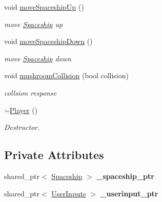 \begin{DoxyCompactItemize}
\mbox{\label{class_player_afd45fb5e09d49881ab0f01c4bad9579a}} 
void \mbox{\hyperlink{class_player_afd45fb5e09d49881ab0f01c4bad9579a}{move\+Spaceship\+Up}} ()
\begin{DoxyCompactList}\small\item\em move \mbox{\hyperlink{class_spaceship}{Spaceship}} up \end{DoxyCompactList}\item 
\mbox{\label{class_player_a03016a49c89eba88af462908b9ce205f}} 
void \mbox{\hyperlink{class_player_a03016a49c89eba88af462908b9ce205f}{move\+Spaceship\+Down}} ()
\begin{DoxyCompactList}\small\item\em move \mbox{\hyperlink{class_spaceship}{Spaceship}} down \end{DoxyCompactList}\item 
void \mbox{\hyperlink{class_player_acaa4c1b39f725f0de4b2b3d39bc34dd3}{mushroom\+Collision}} (bool collision)
\begin{DoxyCompactList}\small\item\em collsion response \end{DoxyCompactList}\item 
\mbox{\label{class_player_a749d2c00e1fe0f5c2746f7505a58c062}} 
\mbox{\hyperlink{class_player_a749d2c00e1fe0f5c2746f7505a58c062}{$\sim$\+Player}} ()
\begin{DoxyCompactList}\small\item\em Destructor. \end{DoxyCompactList}\end{DoxyCompactItemize}
\subsection*{Private Attributes}
\begin{DoxyCompactItemize}
\item 
\mbox{\label{class_player_a57505f678abee3c78186df28399a6ba5}} 
shared\+\_\+ptr$<$ \mbox{\hyperlink{class_spaceship}{Spaceship}} $>$ {\bfseries \+\_\+spaceship\+\_\+ptr}
\item 
\mbox{\label{class_player_aab5512ab5cfa7c95120acaa6409d3c3e}} 
shared\+\_\+ptr$<$ \mbox{\hyperlink{class_user_inputs}{User\+Inputs}} $>$ {\bfseries \+\_\+userinput\+\_\+ptr}
\end{DoxyCompactItemize}


